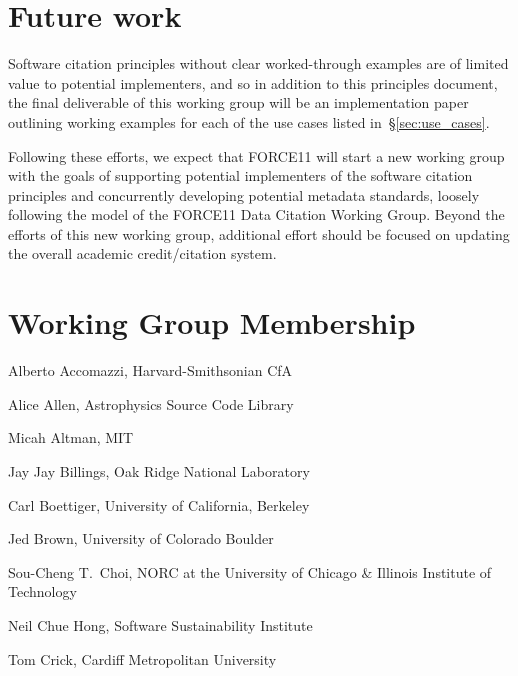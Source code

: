 \documentclass[12pt, oneside]{amsart}
\newcommand{\dmnote}[1]{ {\textcolor{purple} { ***DM: #1 }}} %
\newcommand{\LJHnote}[1]{ {\textcolor{fuschsia} { ***LJH: #1 }}} %
\begin{document}

\section{Future work}
\label{sec:futurework}

Software citation principles without clear worked-through examples are of
limited value to potential implementers, and so in addition to this principles
document, the final deliverable of this working group will be an implementation
paper outlining working examples for each of the use cases listed in~\S\ref{sec:use_cases}.

Following these efforts, we expect that FORCE11 will start a new working group
with the goals of supporting potential implementers of the software citation
principles and concurrently developing potential metadata standards, loosely following the model
of the FORCE11 Data Citation Working Group.
Beyond the efforts of this new working group, additional effort should be focused on updating the overall academic credit\slash citation system.


\appendix

\section{Working Group Membership}
\label{app:wg_members}

Alberto Accomazzi, Harvard-Smithsonian CfA

Alice Allen, Astrophysics Source Code Library

Micah Altman, MIT

Jay Jay Billings, Oak Ridge National Laboratory

Carl Boettiger, University of California,  Berkeley

Jed Brown, University of Colorado Boulder

Sou-Cheng T.~Choi, NORC at the University of Chicago \& Illinois Institute of Technology

Neil Chue Hong, Software Sustainability Institute

Tom Crick, Cardiff Metropolitan University
\end{document}
